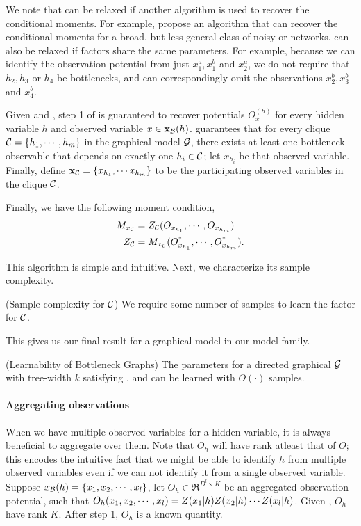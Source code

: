 We note that  can be relaxed if another
  algorithm is used to recover the conditional moments. For example,
  \citet{halpern13noisyor} propose an algorithm that can recover the
  conditional moments for a broad, but less general class of noisy-or
  networks.
 can also be relaxed if factors share the same
  parameters. 
For example, because we can identify the observation potential from just
  $x^a_1, x^b_1$ and $x^a_2$, we do not require that $h_2, h_3$ or $h_4$
  be bottlenecks, and can correspondingly omit the observations $x^b_2,
  x^b_3$ and $x^b_4$.

Given  and , step
  1 of  is guaranteed to recover potentials
  $O^{(h)}_{x}$ for every hidden variable $h$ and observed variable $x \in
  \mathbf{x}_{\mathcal{B}}(h)$.
 guarantees that for every clique $\mathcal{C}
  = \{h_1, \cdots, h_m\}$ in the graphical model $\mathcal{G}$, there exists at
  least one bottleneck observable that depends on exactly one $h_i \in
  \mathcal{C}$; let $x_{h_i}$ be that observed variable\verify. 
Finally, define $\mathbf{x}_{\mathcal{C}} = \{x_{h_1}, \cdots x_{h_m}\}$ to be the
  participating observed variables in the clique $\mathcal{C}$.

Finally, we have the following moment condition,
\begin{align*}
  M_{x_{\mathcal{C}}} &= Z_{\mathcal{C}}(O_{x_{h_1}}, \cdots, O_{x_{h_m}}) \\
  Z_{\mathcal{C}} &= M_{x_{\mathcal{C}}}({O}^{\dagger}_{x_{h_1}}, \cdots, {O}^{\dagger}_{x_{h_m}}).
\end{align*}

This algorithm is simple and intuitive. Next, we characterize its sample complexity.

\begin{lemma}(Sample complexity for $\mathcal{C}$)
We require some number of samples to learn the factor for $\mathcal{C}$.
\end{lemma}

This gives us our final result for a graphical model in our model
family.
\begin{theorem}(Learnability of Bottleneck Graphs)
The parameters for a directed graphical $\mathcal{G}$ with tree-width $k$
satisfying ,  and
 can be learned with $O(\cdot)$ samples.
\end{theorem}


\paragraph{Aggregating observations}

When we have multiple observed variables for a hidden variable, it is
  always beneficial to aggregate over them.
Note that $O_h$ will have rank atleast that of $O$; this encodes the
  intuitive fact that we might be able to identify $h$ from multiple
  observed variables even if we can not identify it from a single
  observed variable. 
Suppose $x_{\mathcal{B}}(h) = \{x_1, x_2, \cdots, x_l\}$, let $O_h \in
  \Re^{D^l \times K}$ be an
  aggregated observation potential, such that $O_h(x_1, x_2, \cdots,
  x_l) = Z(x_1|h) Z(x_2|h) \cdots Z(x_l|h)$.
Given , $O_h$ have rank $K$.
After step 1, $O_h$ is a known quantity.
